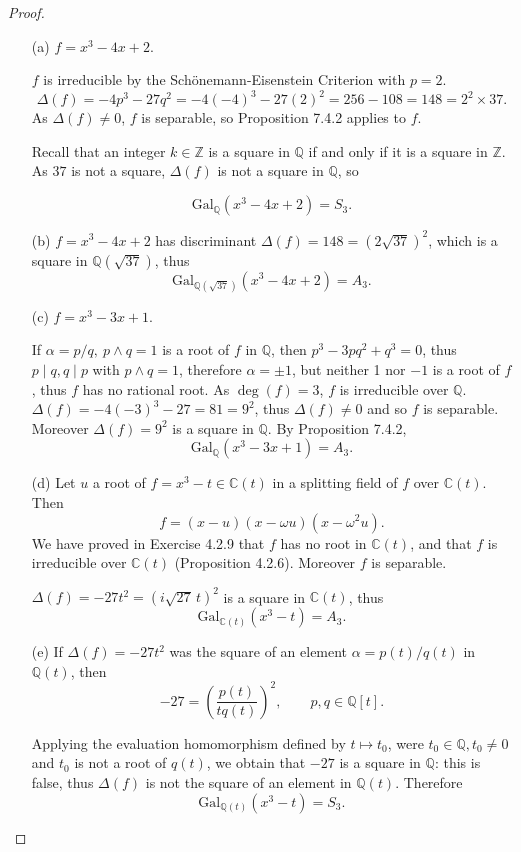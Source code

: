 \documentclass[11pt,a4paper]{article}
\newcommand{\Q}{\mathbb{Q}}
\newcommand{\Z}{\mathbb{Z}}
\newcommand{\C}{\mathbb{C}}
\newcommand{\Gal}{\mathrm{Gal}}
\begin{document}
\begin{proof}
\begin{enumerate}
\item[(a)]
$f= x^3-4x+2.$

$f$ is irreducible by the Sch\"onemann-Eisenstein Criterion with $p = 2$.
$$ \Delta(f) = -4p^3-27q^2 = -4(-4)^3 - 27(2)^2 = 256 -108 = 148 = 2^2\times 37 .$$
As $\Delta(f) \ne 0$, $f$ is separable, so Proposition 7.4.2 applies to $f$.

Recall that an integer $k\in \Z$ is a square in $\Q$ if and only if it is a square in $\Z$. As $37$ is not a square, $\Delta(f)$ is not a square in $\Q$, so

$$\Gal_\Q(x^3-4x+2) =S_3.$$

\item[(b)] $f= x^3-4x+2$ has discriminant $\Delta(f) = 148 =(2 \sqrt{37})^2$, which is a square in  $\Q(\sqrt{37})$, thus
$$\Gal_{\Q(\sqrt{37})}( x^3-4x+2) = A_3.$$

\item[(c)] $f=x^3-3x+1$.

If $\alpha = p/q,\ p\wedge q=1$ is a root of $f$ in $\Q$, then $p^3 - 3 pq^2+q^3 = 0$, thus $p \mid q, q\mid p$ with $p\wedge q = 1$, therefore $\alpha = \pm1$, but neither 1 nor $-1$ is a root of $f$, thus $f$ has no rational root. As $\deg(f) = 3$, $f$ is irreducible over $\Q$.
$\Delta(f) = -4(-3)^3 - 27 = 81 = 9^2$, thus $\Delta (f) \ne 0$ and so $f$ is separable. Moreover $\Delta(f) = 9^2$ is a square in  $\Q$. By Proposition 7.4.2,
$$\Gal_{\Q}(x^3-3x+1) = A_3.$$

\item[(d)]
Let $u$ a root of $f = x^3 - t \in \C(t)$ in a splitting field of $f$ over $\C(t)$. Then
$$f = (x-u)(x-\omega u)(x-\omega^2u).$$
We have proved in Exercise 4.2.9 that $f$ has no root in $\C(t)$, and that $f$ is irreducible over $\C(t)$ (Proposition 4.2.6). Moreover $f$ is separable.

$\Delta(f) = -27 t^2 = (i\sqrt{27}\,  t)^2$ is a square in $\C(t)$, thus
$$\Gal_{\C(t)}(x^3-t) = A_3.$$

\item[(e)]
If $\Delta(f) = -27 t^2$ was the square of an element $\alpha = p(t)/q(t)$ in $\Q(t)$, then $$-27 = \left(\frac{p(t)}{tq(t)}\right)^2,\qquad p,q \in \Q[t].$$

Applying the evaluation homomorphism defined by $t\mapsto t_0$, were $t_0\in \Q,t_0\neq 0$ and $t_0$ is not a root of $q(t)$, we obtain that $-27$ is a square in $\Q$: this is false, thus $\Delta(f)$ is not the square of an element in $\Q(t)$. Therefore
$$\Gal_{\Q(t)}(x^3-t) = S_3.$$
\end{enumerate}
\end{proof}
\end{document}

